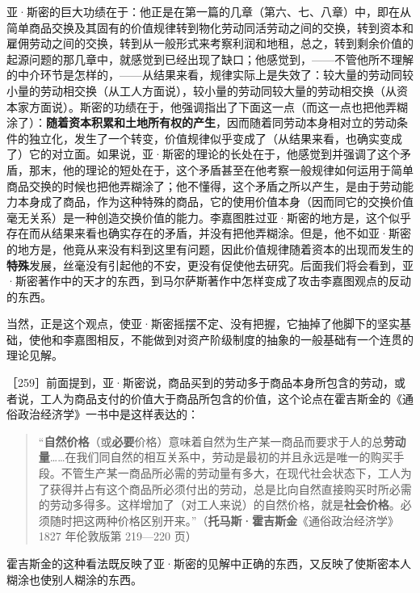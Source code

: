 亚·斯密的巨大功绩在于：他正是在第一篇的几章（第六、七、八章）中，即在从简单商品交换及其固有的价值规律转到物化劳动同活劳动之间的交换，转到资本和雇佣劳动之间的交换，转到从一般形式来考察利润和地租，总之，转到剩余价值的起源问题的那几章中，就感觉到已经出现了缺口；他感觉到，——不管他所不理解的中介环节是怎样的，——从结果来看，规律实际上是失效了：较大量的劳动同较小量的劳动相交换（从工人方面说），较小量的劳动同较大量的劳动相交换（从资本家方面说）。斯密的功绩在于，他强调指出了下面这一点（而这一点也把他弄糊涂了）：\textbf{随着资本积累和土地所有权的产生}，因而随着同劳动本身相对立的劳动条件的独立化，发生了一个转变，价值规律似乎变成了（从结果来看，也确实变成了）它的对立面。如果说，亚·斯密的理论的长处在于，他感觉到并强调了这个矛盾，那末，他的理论的短处在于，这个矛盾甚至在他考察一般规律如何运用于简单商品交换的时候也把他弄糊涂了；他不懂得，这个矛盾之所以产生，是由于劳动能力本身成了商品，作为这种特殊的商品，它的使用价值本身（因而同它的交换价值毫无关系）是一种创造交换价值的能力。李嘉图胜过亚·斯密的地方是，这个似乎存在而从结果来看也确实存在的矛盾，并没有把他弄糊涂。但是，他不如亚·斯密的地方是，他竟从来没有料到这里有问题，因此价值规律随着资本的出现而发生的\textbf{特殊}发展，丝毫没有引起他的不安，更没有促使他去研究。后面我们将会看到，亚·斯密著作中的天才的东西，到马尔萨斯著作中怎样变成了攻击李嘉图观点的反动的东西。

当然，正是这个观点，使亚·斯密摇摆不定、没有把握，它抽掉了他脚下的坚实基础，使他和李嘉图相反，不能做到对资产阶级制度的抽象的一般基础有一个连贯的理论见解。

［259］前面提到，亚·斯密说，商品买到的劳动多于商品本身所包含的劳动，或者说，工人为商品支付的价值大于商品所包含的价值，这个论点在霍吉斯金的《通俗政治经济学》一书中是这样表达的：

\begin{quote}“\textbf{自然价格}（或\textbf{必要}价格）意味着自然为生产某一商品而要求于人的总\textbf{劳动量}……在我们同自然的相互关系中，劳动是最初的并且永远是唯一的购买手段。不管生产某一商品所必需的劳动量有多大，在现代社会状态下，工人为了获得并占有这个商品所必须付出的劳动，总是比向自然直接购买时所必需的劳动多得多。这样增加了（对工人来说）的自然价格，就是\textbf{社会价格}。必须随时把这两种价格区别开来。”（\textbf{托马斯·霍吉斯金}《通俗政治经济学》1827 年伦敦版第 219—220 页）\end{quote}

霍吉斯金的这种看法既反映了亚·斯密的见解中正确的东西，又反映了使斯密本人糊涂也使别人糊涂的东西。

